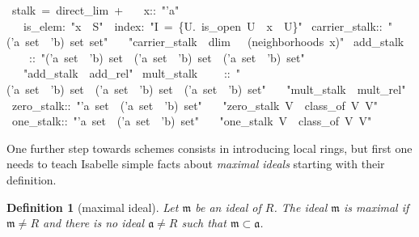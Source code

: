 \documentclass[12pt]{scrartcl}
\newtheorem{definition}[proposition]{Definition}
\begin{document}

\begin{isabelle}
\ stalk\ =\ direct\_lim\ +\isanewline
\ \ \ x::\ "'a"\isanewline
\ \ \ is\_elem:\ "x\ \isasymin \ S"\ \ index:\ "I\ =\ \{U.\ is\_open\ U\ \isasymand \ x\ \isasymin \ U\}"\isanewline
{}\isanewline
\isanewline
{}\ carrier\_stalk::\ "('a\ set\ \isasymtimes \ 'b)\ set\ set"\isanewline
\ \ \ "carrier\_stalk\ \isasymequiv \ dlim\ \isasymFF \ \isasymrho \ (neighborhoods\ x)"\isanewline
\isanewline
{}\ add\_stalk\isanewline
\ \ \ \ ::\ "('a\ set\ \isasymtimes \ 'b)\ set\ \isasymRightarrow \ ('a\ set\ \isasymtimes \ 'b)\ set\ \isasymRightarrow \ ('a\ set\ \isasymtimes \ 'b)\ set"\isanewline
\ \ \ "add\_stalk\ \isasymequiv \ add\_rel"\isanewline
\isanewline
{}\ mult\_stalk\isanewline
\ \ \ \ ::\ "('a\ set\ \isasymtimes \ 'b)\ set\ \isasymRightarrow \ ('a\ set\ \isasymtimes \ 'b)\ set\ \isasymRightarrow \ ('a\ set\ \isasymtimes \ 'b)\ set"\isanewline
\ \ \ "mult\_stalk\ \isasymequiv \ mult\_rel"\isanewline
\isanewline
{}\ zero\_stalk::\ "'a\ set\ \isasymRightarrow \ ('a\ set\ \isasymtimes \ 'b)\ set"\isanewline
\ \ \ "zero\_stalk\ V\ \isasymequiv \ class\_of\ V\ \isasymzero \isactrlbsub V\isactrlesub "\isanewline
\isanewline
{}\ one\_stalk::\ "'a\ set\ \isasymRightarrow \ ('a\ set\ \isasymtimes \ 'b)\ set"\isanewline
\ \ \ "one\_stalk\ V\ \isasymequiv \ class\_of\ V\ \isasymone \isactrlbsub V\isactrlesub "\isanewline
\isanewline
{}
\end{isabelle}

One further step towards schemes consists in introducing local rings, but first one needs to teach Isabelle simple facts about \emph{maximal ideals} starting with their definition. 

\begin{definition}[maximal ideal]
	Let $\mathfrak{m}$ be an ideal of $R$. The ideal $\mathfrak{m}$ is maximal if $\mathfrak{m} \neq R$ and there is no ideal $\mathfrak{a} \neq R$ such that $\mathfrak{m} \subset \mathfrak{a}$.
\end{definition}
\end{document}
